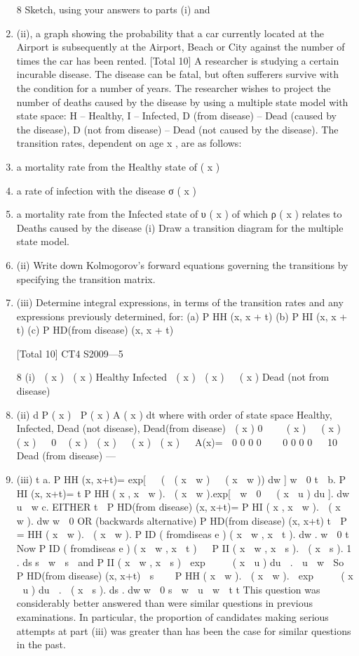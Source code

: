 \documentclass[a4paper,12pt]{article}
\begin{document}
\begin{enumerate}
8
Sketch, using your answers to parts (i) and \item (ii), a graph showing the
probability that a car currently located at the Airport is subsequently at the
Airport, Beach or City against the number of times the car has been rented. 
[Total 10]
A researcher is studying a certain incurable disease. The disease can be fatal, but
often sufferers survive with the condition for a number of years. The researcher
wishes to project the number of deaths caused by the disease by using a multiple state
model with state space:
{ H – Healthy, I – Infected, D (from disease) – Dead (caused by the disease), D (not from disease)
– Dead (not caused by the disease)}.
The transition rates, dependent on age x , are as follows:
\item a mortality rate from the Healthy state of \mu ( x )
\item a rate of infection with the disease σ ( x )
\item a mortality rate from the Infected state of υ ( x ) of which ρ ( x ) relates to Deaths
caused by the disease
(i) Draw a transition diagram for the multiple state model.
\item (ii) Write down Kolmogorov’s forward equations governing the transitions by
specifying the transition matrix.

\item (iii) Determine integral expressions, in terms of the transition rates and any
expressions previously determined, for:
(a) P HH (x, x + t)
(b) P HI (x, x + t)
(c) P HD(from disease) (x, x + t)


[Total 10]
CT4 S2009—5

8
(i)
 ( x )
 ( x )
Healthy Infected
 ( x )  ( x )   ( x )
Dead (not
from
disease)
\item (ii)
d
P ( x )  P ( x ) A ( x )
dt
where with order of state space
{Healthy, Infected, Dead (not disease), Dead(from disease)}
 ( x )
0 
  ( x )   ( x )  ( x )


0
 ( x )  ( x )   ( x )  ( x ) 

A(x)=

0
0
0
0 


0
0
0
0 

10
Dead
(from
disease)  — %
\item (iii)
t
a. P HH (x, x+t)= exp[ 

(  ( x  w )   ( x  w )) dw ]
w  0
t

b. P HI (x, x+t)=
t
P HH ( x , x  w ).  ( x  w ).exp[ 
w  0

 ( x  u ) du ]. dw
u  w
c. EITHER
t

P HD(from disease) (x, x+t)=
P HI ( x , x  w ).  ( x  w ). dw
w  0
OR (backwards alternative)
P HD(from disease) (x, x+t)
t
 P
=
HH
( x  w ).  ( x  w ). P ID ( fromdiseas e ) ( x  w , x  t ). dw .
w  0
t
Now P ID ( fromdiseas e ) ( x  w , x  t ) 
 P
II
( x  w , x  s ).  ( x  s ). 1 . ds
s  w
 s

and P II ( x  w , x  s )  exp     ( x  u ) du  .
 u  w

So P HD(from disease) (x, x+t)
 s

  P HH ( x  w ).  ( x  w ).  exp     ( x  u ) du  .  ( x  s ). ds . dw
w  0
s  w
 u  w

t
t
This question was considerably better answered than were similar questions in
previous examinations. In particular, the proportion of candidates making serious
attempts at part (iii) was greater than has been the case for similar questions in the
past.



\end{enumerate}
\end{document}
